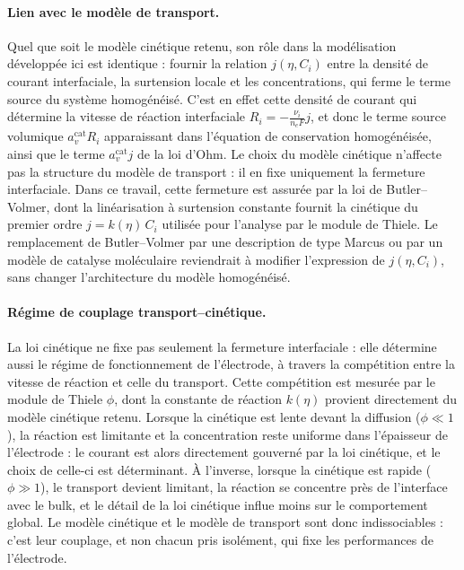 \paragraph{Lien avec le modèle de transport.}
Quel que soit le modèle cinétique retenu, son rôle dans la modélisation
développée ici est identique : fournir la relation $j(\eta, C_i)$ entre la
densité de courant interfaciale, la surtension locale et les concentrations,
qui ferme le terme source du système homogénéisé. C'est en effet cette
densité de courant qui détermine la vitesse de réaction interfaciale
$R_i = -\frac{\nu_i}{n_e F} j$, et donc le terme source volumique
$a_v^{\mathrm{cat}} R_i$ apparaissant dans l'équation de conservation
homogénéisée, ainsi que le terme $a_v^{\mathrm{cat}} j$ de la loi d'Ohm. Le
choix du modèle cinétique n'affecte pas la structure du modèle de transport :
il en fixe uniquement la fermeture interfaciale. Dans ce travail, cette
fermeture est assurée par la loi de Butler--Volmer, dont la linéarisation à
surtension constante fournit la cinétique du premier ordre
$j = k(\eta)\,C_i$ utilisée pour l'analyse par le module de Thiele. Le
remplacement de Butler--Volmer par une description de type Marcus ou par un
modèle de catalyse moléculaire reviendrait à modifier l'expression de
$j(\eta, C_i)$, sans changer l'architecture du modèle homogénéisé.

\paragraph{Régime de couplage transport--cinétique.}
La loi cinétique ne fixe pas seulement la fermeture interfaciale : elle
détermine aussi le régime de fonctionnement de l'électrode, à travers la
compétition entre la vitesse de réaction et celle du transport. Cette
compétition est mesurée par le module de Thiele $\phi$, dont la constante de
réaction $k(\eta)$ provient directement du modèle cinétique retenu. Lorsque la
cinétique est lente devant la diffusion ($\phi \ll 1$), la réaction est
limitante et la concentration reste uniforme dans l'épaisseur de l'électrode :
le courant est alors directement gouverné par la loi cinétique, et le choix de
celle-ci est déterminant. À l'inverse, lorsque la cinétique est rapide
($\phi \gg 1$), le transport devient limitant, la réaction se concentre près
de l'interface avec le bulk, et le détail de la loi cinétique influe moins sur
le comportement global. Le modèle cinétique et le modèle de transport sont
donc indissociables : c'est leur couplage, et non chacun pris isolément, qui
fixe les performances de l'électrode.